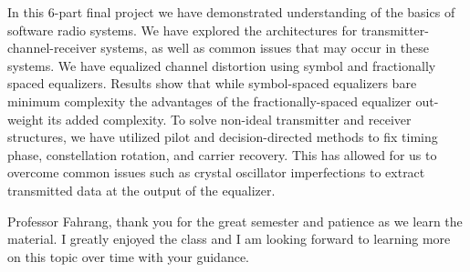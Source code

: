 In this 6-part final project we have demonstrated understanding of the basics of software radio systems. We have explored the architectures for transmitter-channel-receiver systems, as well as common issues that may occur in these systems. We have equalized channel distortion using symbol and fractionally spaced equalizers. Results show that while symbol-spaced equalizers bare minimum complexity the advantages of the fractionally-spaced equalizer out-weight its added complexity. To solve non-ideal transmitter and receiver structures, we have utilized pilot and decision-directed methods to fix timing phase, constellation rotation, and carrier recovery. This has allowed for us to overcome common issues such as crystal oscillator imperfections to extract transmitted data at the output of the equalizer. 

Professor Fahrang, thank you for the great semester and patience as we learn the material. I greatly enjoyed the class and I am looking forward to learning more on this topic over time with your guidance.
